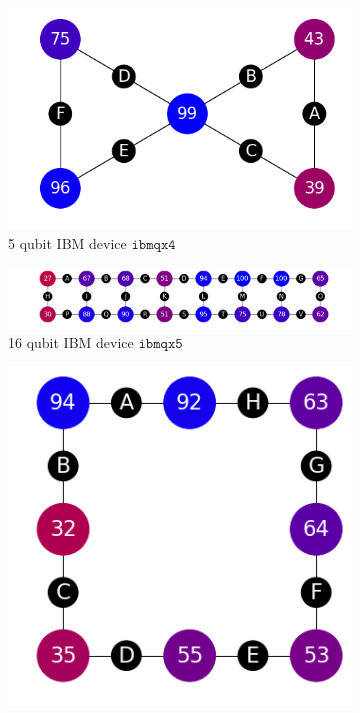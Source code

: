 \documentclass[aps,prl,twocolumn,showpacs,preprintnumbers]{revtex4-1}
\begin{document}
\begin{figure}
    \centering
    \begin{subfigure}[b]{0.5\columnwidth}
        \includegraphics[width=\textwidth]{figures/ibmqx4.png}
        \caption{5 qubit IBM device $\mathtt{ibmqx4}$}
    \end{subfigure}
    \begin{subfigure}[b]{\columnwidth}
        \includegraphics[width=\textwidth]{figures/ibmqx5.png}
        \caption{16 qubit IBM device $\mathtt{ibmqx5}$}
    \end{subfigure}
    \begin{subfigure}[b]{0.5\columnwidth}
       	\includegraphics[width=\textwidth]{figures/agave.png}

\end{subfigure}
\end{figure}
\end{document}
